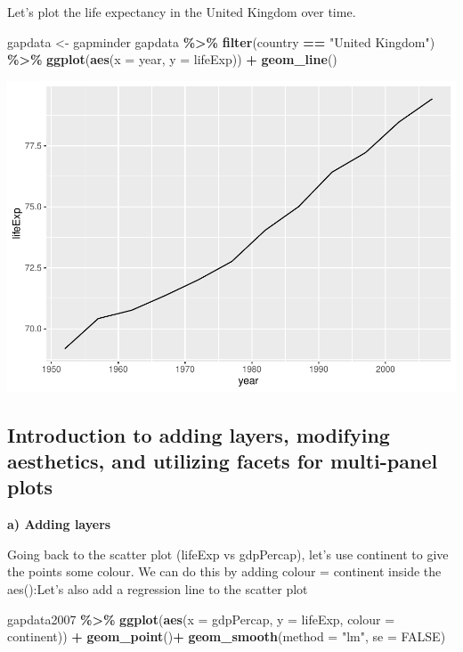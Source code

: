 \documentclass[
]{book}
\newenvironment{Shaded}{\begin{snugshade}}{\end{snugshade}}
\newcommand{\AttributeTok}[1]{\textcolor[rgb]{0.13,0.29,0.53}{#1}}
\newcommand{\ConstantTok}[1]{\textcolor[rgb]{0.56,0.35,0.01}{#1}}
\newcommand{\FunctionTok}[1]{\textcolor[rgb]{0.13,0.29,0.53}{\textbf{#1}}}
\newcommand{\NormalTok}[1]{#1}
\newcommand{\OtherTok}[1]{\textcolor[rgb]{0.56,0.35,0.01}{#1}}
\newcommand{\SpecialCharTok}[1]{\textcolor[rgb]{0.81,0.36,0.00}{\textbf{#1}}}
\newcommand{\StringTok}[1]{\textcolor[rgb]{0.31,0.60,0.02}{#1}}
\begin{document}
Let's plot the life expectancy in the United Kingdom over time.

\begin{Shaded}
\begin{Highlighting}[]
\NormalTok{gapdata }\OtherTok{\textless{}{-}}\NormalTok{ gapminder}
\NormalTok{gapdata }\SpecialCharTok{\%\textgreater{}\%}
\FunctionTok{filter}\NormalTok{(country }\SpecialCharTok{==} \StringTok{"United Kingdom"}\NormalTok{) }\SpecialCharTok{\%\textgreater{}\%}
\FunctionTok{ggplot}\NormalTok{(}\FunctionTok{aes}\NormalTok{(}\AttributeTok{x =}\NormalTok{ year, }\AttributeTok{y =}\NormalTok{ lifeExp)) }\SpecialCharTok{+}
\FunctionTok{geom\_line}\NormalTok{()}
\end{Highlighting}
\end{Shaded}

\includegraphics{_main_files/figure-latex/unnamed-chunk-80-1.pdf}

\subsection{Introduction to adding layers, modifying aesthetics, and utilizing facets for multi-panel plots}\label{introduction-to-adding-layers-modifying-aesthetics-and-utilizing-facets-for-multi-panel-plots}

\textbf{a) Adding layers}

Going back to the scatter plot (lifeExp vs gdpPercap), let's use continent to give the points some colour. We can do this by adding colour = continent inside the aes():Let's also add a regression line to the scatter plot

\begin{Shaded}
\begin{Highlighting}[]
\NormalTok{gapdata2007 }\SpecialCharTok{\%\textgreater{}\%}
\FunctionTok{ggplot}\NormalTok{(}\FunctionTok{aes}\NormalTok{(}\AttributeTok{x =}\NormalTok{ gdpPercap, }\AttributeTok{y =}\NormalTok{ lifeExp, }\AttributeTok{colour =}\NormalTok{ continent)) }\SpecialCharTok{+}
\FunctionTok{geom\_point}\NormalTok{()}\SpecialCharTok{+}
\FunctionTok{geom\_smooth}\NormalTok{(}\AttributeTok{method =} \StringTok{"lm"}\NormalTok{, }\AttributeTok{se =} \ConstantTok{FALSE}\NormalTok{)}
\end{Highlighting}
\end{Shaded}
\end{document}
